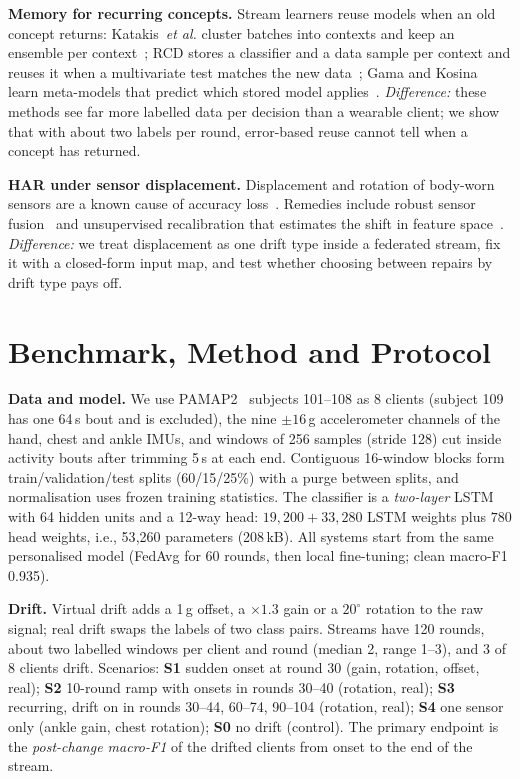 \documentclass[conference]{IEEEtran}
\newcommand{\fone}{macro-F1}
\begin{document}
\textbf{Memory for recurring concepts.} Stream learners reuse models when an old concept returns: Katakis~\emph{et al.} cluster batches into contexts and keep an ensemble per context~\cite{katakis2010recurring}; RCD stores a classifier and a data sample per context and reuses it when a multivariate test matches the new data~\cite{goncalves2013rcd}; Gama and Kosina learn meta-models that predict which stored model applies~\cite{gama2014recurrent}. \emph{Difference:} these methods see far more labelled data per decision than a wearable client; we show that with about two labels per round, error-based reuse cannot tell when a concept has returned.

\textbf{HAR under sensor displacement.} Displacement and rotation of body-worn sensors are a known cause of accuracy loss~\cite{kunze2014placement,banos2014displacement}. Remedies include robust sensor fusion~\cite{banos2014displacement} and unsupervised recalibration that estimates the shift in feature space~\cite{chavarriaga2013unsupervised}. \emph{Difference:} we treat displacement as one drift type inside a federated stream, fix it with a closed-form input map, and test whether choosing between repairs by drift type pays off.

\section{Benchmark, Method and Protocol}
\textbf{Data and model.} We use PAMAP2~\cite{reiss2012pamap2} subjects 101--108 as 8 clients (subject 109 has one 64\,s bout and is excluded), the nine $\pm16$\,g accelerometer channels of the hand, chest and ankle IMUs, and windows of 256 samples (stride 128) cut inside activity bouts after trimming 5\,s at each end. Contiguous 16-window blocks form train/validation/test splits (60/15/25\%) with a purge between splits, and normalisation uses frozen training statistics. The classifier is a \emph{two-layer} LSTM with 64 hidden units and a 12-way head: $19{,}200+33{,}280$ LSTM weights plus $780$ head weights, i.e., 53{,}260 parameters (208\,kB). All systems start from the same personalised model (FedAvg for 60 rounds, then local fine-tuning; clean \fone{} 0.935).

\textbf{Drift.} Virtual drift adds a 1\,g offset, a $\times1.3$ gain or a $20^\circ$ rotation to the raw signal; real drift swaps the labels of two class pairs. Streams have 120 rounds, about two labelled windows per client and round (median 2, range 1--3), and 3 of 8 clients drift. Scenarios: \textbf{S1} sudden onset at round 30 (gain, rotation, offset, real); \textbf{S2} 10-round ramp with onsets in rounds 30--40 (rotation, real); \textbf{S3} recurring, drift on in rounds 30--44, 60--74, 90--104 (rotation, real); \textbf{S4} one sensor only (ankle gain, chest rotation); \textbf{S0} no drift (control). The primary endpoint is the \emph{post-change \fone{}} of the drifted clients from onset to the end of the stream.
\end{document}
